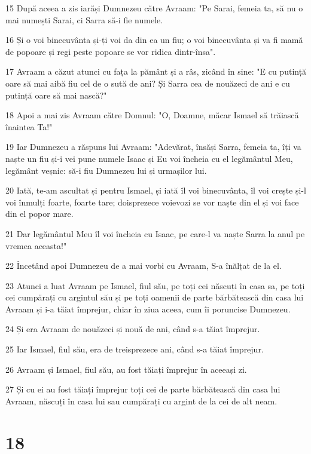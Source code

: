 \par 15 După aceea a zis iarăși Dumnezeu către Avraam: "Pe Sarai, femeia ta, să nu o mai numești Sarai, ci Sarra să-i fie numele.
\par 16 Și o voi binecuvânta și-ți voi da din ea un fiu; o voi binecuvânta și va fi mamă de popoare și regi peste popoare se vor ridica dintr-însa".
\par 17 Avraam a căzut atunci cu fața la pământ și a râs, zicând în sine: "E cu putință oare să mai aibă fiu cel de o sută de ani? Și Sarra cea de nouăzeci de ani e cu putință oare să mai nască?"
\par 18 Apoi a mai zis Avraam către Domnul: "O, Doamne, măcar Ismael să trăiască înaintea Ta!"
\par 19 Iar Dumnezeu a răspuns lui Avraam: "Adevărat, însăși Sarra, femeia ta, îți va naște un fiu și-i vei pune numele Isaac și Eu voi încheia cu el legământul Meu, legământ veșnic: să-i fiu Dumnezeu lui și urmașilor lui.
\par 20 Iată, te-am ascultat și pentru Ismael, și iată îl voi binecuvânta, îl voi crește și-l voi înmulți foarte, foarte tare; doisprezece voievozi se vor naște din el și voi face din el popor mare.
\par 21 Dar legământul Meu îl voi încheia cu Isaac, pe care-l va naște Sarra la anul pe vremea aceasta!"
\par 22 Încetând apoi Dumnezeu de a mai vorbi cu Avraam, S-a înălțat de la el.
\par 23 Atunci a luat Avraam pe Ismael, fiul său, pe toți cei născuți în casa sa, pe toți cei cumpărați cu argintul său și pe toți oamenii de parte bărbătească din casa lui Avraam și i-a tăiat împrejur, chiar în ziua aceea, cum îi poruncise Dumnezeu.
\par 24 Și era Avraam de nouăzeci și nouă de ani, când s-a tăiat împrejur.
\par 25 Iar Ismael, fiul său, era de treisprezece ani, când s-a tăiat împrejur.
\par 26 Avraam și Ismael, fiul său, au fost tăiați împrejur în aceeași zi.
\par 27 Și cu ei au fost tăiați împrejur toți cei de parte bărbătească din casa lui Avraam, născuți în casa lui sau cumpărați cu argint de la cei de alt neam.

\chapter{18}

